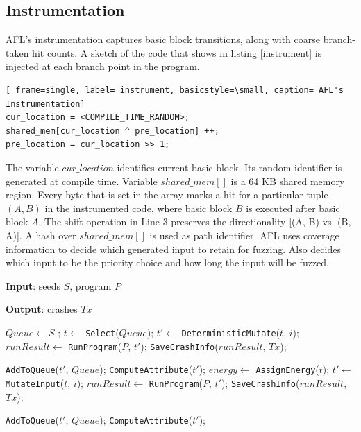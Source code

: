 \subsection{Instrumentation} 

AFL's instrumentation captures basic block transitions, along with coarse branch-taken hit counts. A sketch of the code that shows in listing \ref{instrument} is injected at each branch point in the program. 

\begin{lstlisting}[ frame=single, label= instrument, basicstyle=\small, caption= AFL's Instrumentation]  
cur_location = <COMPILE_TIME_RANDOM>; 
shared_mem[cur_location ^ pre_locatiom] ++;
pre_location = cur_location >> 1;
\end{lstlisting}
The variable $cur\_location$ identifies current basic block. Its random identifier is generated at compile time. Variable $shared\_mem[]$ is a 64 KB shared memory region. Every byte that is set in the array marks a hit for a particular tuple  $(A, B)$ in the instrumented code, where basic block $B$ is executed after basic block $A$. The shift operation in Line 3 preserves the directionality [(A, B) vs. (B, A)]. A hash over $shared\_mem[]$ is used as path identifier. AFL uses coverage information to decide which generated input to retain for fuzzing. Also decides which input to be the priority choice and how long the input will be fuzzed. 
 
\begin{algorithm}[t]
\caption{AFL Greybox Fuzzing} 
\label{aflalgo}
\hspace*{\algorithmicindent} \textbf{Input}: seeds $S$, program $P$

\hspace*{\algorithmicindent} \textbf{Output}: crashes $Tx$
\begin{algorithmic}[1]
    \STATE $Queue \leftarrow S$ ;
        \STATE $t \leftarrow$ \texttt{Select}($Queue$);
            \STATE $t' \leftarrow$ \texttt{DeterministicMutate}($t$, $i$);
            \STATE $runResult \leftarrow$ \texttt{RunProgram}($P$, $t'$);
                 \STATE \texttt{SaveCrashInfo}($runResult$, $Tx$);
            \ENDIF
    
                \STATE \texttt{AddToQueue}($t'$, $Queue$);
                \STATE \texttt{ComputeAttribute}($t'$);
            \ENDIF
        \ENDFOR    
        \STATE $energy \leftarrow$ \texttt{AssignEnergy}($t$);
            \STATE $t' \leftarrow$ \texttt{MutateInput}($t$, $i$);
            \STATE $runResult \leftarrow$ \texttt{RunProgram}($P$, $t'$);
                \STATE \texttt{SaveCrashInfo}($runResult$, $Tx$);
            \ENDIF
    
                \STATE \texttt{AddToQueue}($t'$, $Queue$);
                \STATE \texttt{ComputeAttribute}($t'$);
            \ENDIF
        \ENDFOR    
    \ENDWHILE
\end{algorithmic}
\end{algorithm}


